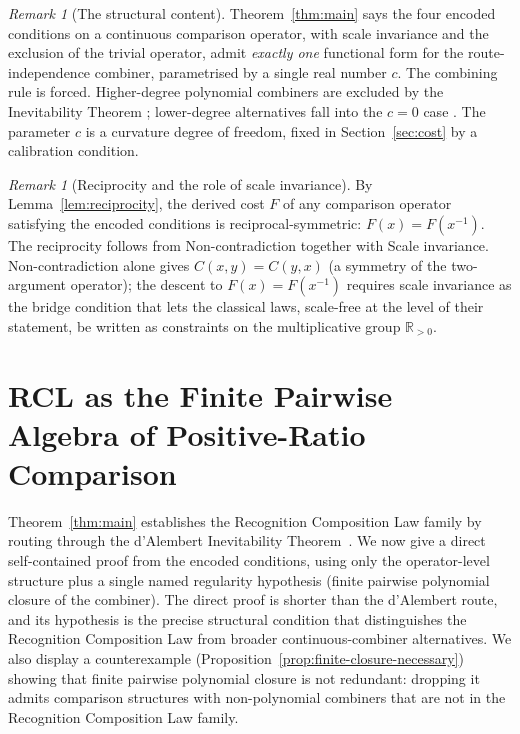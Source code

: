 \documentclass[11pt,a4paper]{article}
\theoremstyle{definition}
\theoremstyle{remark}
\newtheorem{remark}[theorem]{Remark}
\begin{document}
\begin{remark}[The structural content]
\label{rem:structural-content}
Theorem~\ref{thm:main} says the four encoded conditions on a continuous
comparison operator, with scale invariance and the exclusion of the
trivial operator, admit \emph{exactly one} functional form for the
route-independence combiner, parametrised by a single real number
$c$. The combining rule is forced. Higher-degree polynomial combiners
are excluded by the Inevitability Theorem
\cite[Theorem~1]{WashburnZlatanovicAllahyarov2026}; lower-degree
alternatives fall into the $c = 0$ case
\cite[Remark~4]{WashburnZlatanovicAllahyarov2026}. The parameter $c$
is a curvature degree of freedom, fixed in Section~\ref{sec:cost} by a
calibration condition.
\end{remark}

\begin{remark}[Reciprocity and the role of scale invariance]
\label{rem:reciprocity}
By Lemma~\ref{lem:reciprocity}, the derived cost $F$ of any comparison
operator satisfying the encoded conditions is reciprocal-symmetric:
$F(x) = F(x^{-1})$. The reciprocity follows from Non-contradiction
together with Scale invariance. Non-contradiction alone gives
$C(x, y) = C(y, x)$ (a symmetry of the two-argument operator); the
descent to $F(x) = F(x^{-1})$ requires scale invariance as the bridge
condition that lets the classical laws, scale-free at the level of
their statement, be written as constraints on the multiplicative group
$\mathbb{R}_{>0}$.
\end{remark}

\section{RCL as the Finite Pairwise Algebra of Positive-Ratio Comparison}\label{sec:finite-pairwise}

Theorem~\ref{thm:main} establishes the Recognition Composition Law
family by routing through the d'Alembert Inevitability
Theorem~\cite{WashburnZlatanovicAllahyarov2026}. We now give a direct
self-contained proof from the encoded conditions, using only the
operator-level structure plus a single named regularity hypothesis
(finite pairwise polynomial closure of the combiner). The direct proof
is shorter than the d'Alembert route, and its hypothesis is the precise
structural condition that distinguishes the Recognition Composition Law
from broader continuous-combiner alternatives. We also display a
counterexample (Proposition~\ref{prop:finite-closure-necessary}) showing
that finite pairwise polynomial closure is not redundant: dropping it
admits comparison structures with non-polynomial combiners that are not
in the Recognition Composition Law family.
\end{document}
